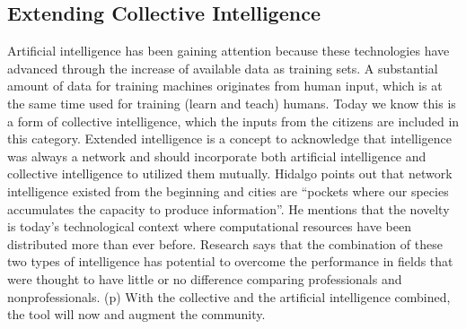 \subsection{Extending Collective Intelligence}
Artificial intelligence has been gaining attention because these technologies have advanced through the increase of available data as training sets. A substantial amount of data for training machines originates from human input, which is at the same time used for training (learn and teach) humans. Today we know this is a form of collective intelligence, which the inputs from the citizens are included in this category. Extended intelligence is a concept to acknowledge that intelligence was always a network and should incorporate both artificial intelligence and collective intelligence to utilized them mutually.\cite{pubpub:extended} Hidalgo points out that network intelligence existed from the beginning and cities are “pockets where our species accumulates the capacity to produce information”.\cite{hidalgo2015information} He mentions that the novelty is today's technological context where computational resources have been distributed more than ever before.\cite{pubpub:whatsnew} Research says that the combination of these two types of intelligence has potential to overcome the performance\cite{baharad2011distilling} in fields that were thought to have little or no difference comparing professionals and nonprofessionals. (p\pageref{subsec:wicked}) With the collective and the artificial intelligence combined, the tool will now  and augment the community.